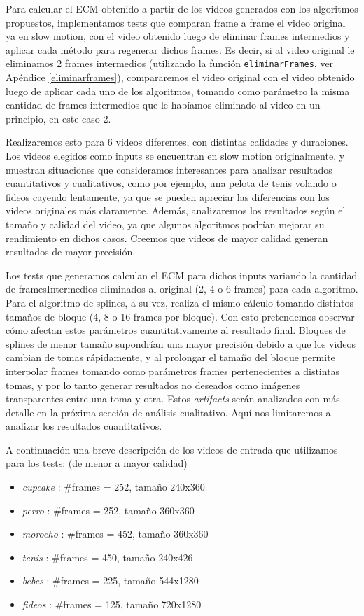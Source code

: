 \par Para calcular el ECM obtenido a partir de los videos generados con los algoritmos propuestos, implementamos tests que comparan frame a frame el video original ya en slow motion, con el video obtenido luego de eliminar frames intermedios y aplicar cada método para regenerar dichos frames. Es decir, si al video original le eliminamos 2 frames intermedios (utilizando la función \texttt{eliminarFrames}, ver Apéndice \ref{eliminarframes}), compararemos el video original con el video obtenido luego de aplicar cada uno de los algoritmos, tomando como parámetro la misma cantidad de frames intermedios que le habíamos eliminado al video en un principio, en este caso 2.
\par Realizaremos esto para 6 videos diferentes, con distintas calidades y duraciones. Los videos elegidos como inputs se encuentran en slow motion originalmente, y muestran situaciones que consideramos interesantes para analizar resultados cuantitativos y cualitativos, como por ejemplo, una pelota de tenis volando o fideos cayendo lentamente, ya que se pueden apreciar las diferencias con los videos originales más claramente. Además, analizaremos los resultados según el tamaño y calidad del video, ya que algunos algoritmos podrían mejorar su rendimiento en dichos casos. Creemos que videos de mayor calidad generan resultados de mayor precisión.
\par Los tests que generamos calculan el ECM para dichos inputs variando la cantidad de framesIntermedios eliminados al original (2, 4 o 6 frames) para cada algoritmo. Para el algoritmo de splines, a su vez, realiza el mismo cálculo tomando distintos tamaños de bloque (4, 8 o 16 frames por bloque). Con esto pretendemos observar cómo afectan estos parámetros cuantitativamente al resultado final. Bloques de splines de menor tamaño supondrían una mayor precisión debido a que los videos cambian de tomas rápidamente, y al prolongar el tamaño del bloque permite interpolar frames tomando como parámetros frames pertenecientes a distintas tomas, y por lo tanto generar resultados no deseados como imágenes transparentes entre una toma y otra. Estos \textit{artifacts} serán analizados con más detalle en la próxima sección de análisis cualitativo. Aquí nos limitaremos a analizar los resultados cuantitativos.
\par A continuación una breve descripción de los videos de entrada que utilizamos para los tests: (de menor a mayor calidad)
\begin{itemize}
\item \textit{cupcake} : $\#$frames = 252, tamaño 240x360
\item \textit{perro} : $\#$frames = 252, tamaño 360x360
\item \textit{morocho} : $\#$frames = 452, tamaño 360x360
\item \textit{tenis} : $\#$frames = 450, tamaño 240x426
\item \textit{bebes} : $\#$frames = 225, tamaño 544x1280
\item \textit{fideos} : $\#$frames = 125, tamaño 720x1280
\end{itemize}


